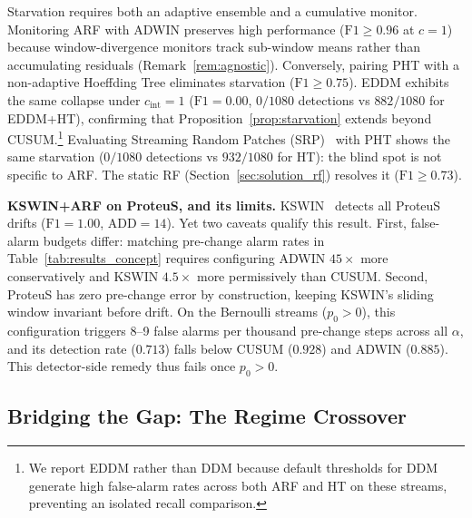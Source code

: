 \documentclass[10pt,conference]{IEEEtran}
\theoremstyle{definition}
\begin{document}
Starvation requires both an adaptive ensemble and a cumulative monitor. Monitoring ARF with ADWIN preserves high performance ($\mathrm{F1} \ge 0.96$ at $c=1$) because window-divergence monitors track sub-window means rather than accumulating residuals (Remark~\ref{rem:agnostic}). Conversely, pairing PHT with a non-adaptive Hoeffding Tree eliminates starvation ($\mathrm{F1} \ge 0.75$). EDDM exhibits the same collapse under $c_{\mathrm{int}}=1$ ($\mathrm{F1} = 0.00$, $0/1080$ detections vs $882/1080$ for EDDM+HT), confirming that Proposition~\ref{prop:starvation} extends beyond CUSUM.\footnote{We report EDDM rather than DDM because default thresholds for DDM generate high false-alarm rates across both ARF and HT on these streams, preventing an isolated recall comparison.} Evaluating Streaming Random Patches (SRP)~\cite{gomes_srp_2019} with PHT shows the same starvation ($0/1080$ detections vs $932/1080$ for HT): the blind spot is not specific to ARF. The static RF (Section~\ref{sec:solution_rf}) resolves it ($\mathrm{F1} \ge 0.73$).

\textbf{KSWIN+ARF on ProteuS, and its limits.}
KSWIN~\cite{raab_kswin_2020} detects all ProteuS drifts ($\mathrm{F1}=1.00$, $\mathrm{ADD}=14$). Yet two caveats qualify this result. First, false-alarm budgets differ: matching pre-change alarm rates in Table~\ref{tab:results_concept} requires configuring ADWIN $45\times$ more conservatively and KSWIN $4.5\times$ more permissively than CUSUM. Second, ProteuS has zero pre-change error by construction, keeping KSWIN's sliding window invariant before drift. On the Bernoulli streams ($p_0 > 0$), this configuration triggers 8--9 false alarms per thousand pre-change steps across all $\alpha$, and its detection rate ($0.713$) falls below CUSUM ($0.928$) and ADWIN ($0.885$). This detector-side remedy thus fails once $p_0 > 0$.

\subsection{Bridging the Gap: The Regime Crossover}\label{sec:crossover}
\end{document}
